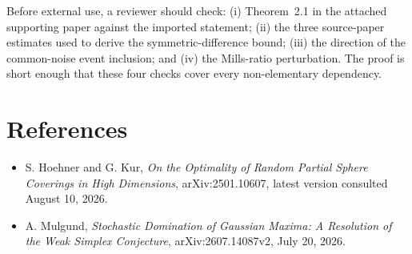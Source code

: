 \documentclass[11pt]{article}
\begin{document}
Before external use, a reviewer should check: (i) Theorem~2.1 in the attached
supporting paper against the imported statement; (ii) the three source-paper
estimates used to derive the symmetric-difference bound; (iii) the direction
of the common-noise event inclusion; and (iv) the Mills-ratio perturbation.
The proof is short enough that these four checks cover every non-elementary
dependency.

\section{References}

\begin{itemize}[leftmargin=*]
\item S. Hoehner and G. Kur, \emph{On the Optimality of Random Partial Sphere
Coverings in High Dimensions}, arXiv:2501.10607, latest version consulted
August 10, 2026.
\item A. Mulgund, \emph{Stochastic Domination of Gaussian Maxima: A Resolution
of the Weak Simplex Conjecture}, arXiv:2607.14087v2, July 20, 2026.
\end{itemize}
\end{document}
